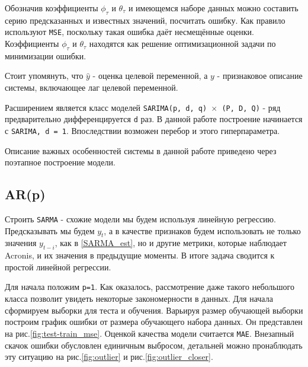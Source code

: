 \documentclass[14pt, a4paper]{extarticle}
\begin{document}
	Обозначив коэффициенты $\phi_{\tau}$ и $\theta_{\tau}$ и имеющемся наборе данных можно составить серию предсказанных и известных значений, посчитать ошибку. 
	Как правило используют \texttt{MSE}, поскольку такая ошибка даёт несмещённые оценки. 
	Коэффициенты $\phi_{\tau}$ и $\theta_{\tau}$ находятся как решение оптимизационной задачи по минимизации ошибки.
	
	Стоит упомянуть, что $\hat{y}$ - оценка целевой переменной, а $y$ - признаковое описание системы, включающее лаг целевой переменной.
	
	Расширением является класс моделей \texttt{SARIMA(p, d, q) $\times$ (P, D, Q)} - ряд предварительно дифференцируется  \texttt{d} раз. 
	В данной работе построение начинается с \texttt{SARIMA, d = 1}. Впоследствии возможен перебор и этого гиперпараметра.
	
	Описание важных особенностей системы в данной работе приведено через поэтапное построение модели.

	\subsection{AR(p)}
	
	Строить \texttt{SARMA} - схожие модели мы будем используя линейную регрессию. 
	Предсказывать мы будем $y_t$, а в качестве признаков будем использовать не только значения $y_{t-i}$, как в \ref{SARMA_est}, но и другие метрики, которые наблюдает Acronis, и их значения в предыдущие моменты. 
	В итоге задача сводится к простой линейной регрессии.
	
	Для начала положим \texttt{p=1}. Как оказалось, рассмотрение даже такого небольшого класса позволит увидеть некоторые закономерности в данных. 
	Для начала сформируем выборки для теста и обучения. 
	Варьируя размер обучающей выборки построим график ошибки от размера обучающего набора данных. 
	Он представлен на рис.\ref{fig:test-train_mse}. 
	Оценкой качества модели считается \texttt{MAE}. 
	Внезапный скачок ошибки обусловлен единичным выбросом, детальней можно пронаблюдать эту ситуацию на рис.\ref{fig:outlier} и рис.\ref{fig:outlier_closer}.
\end{document}
